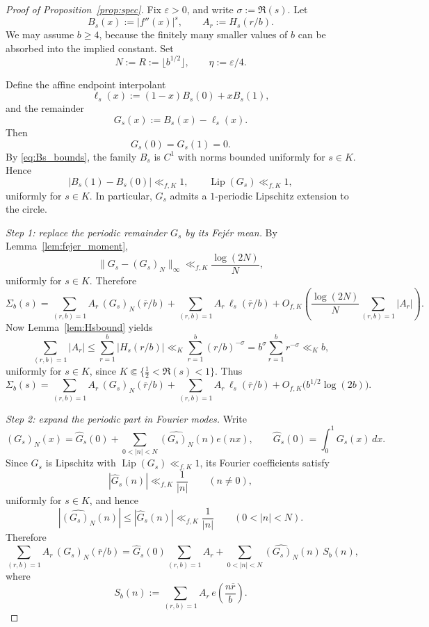 \documentclass[a4paper,american,11pt]{amsart}
\theoremstyle{plain}
\theoremstyle{definition}
\begin{document}
\begin{proof}[Proof of Proposition~\ref{prop:spec}]\label{proof:prop:spec}
Fix \(\varepsilon>0\), and write \(\sigma:=\Re(s)\). Let
\[
B_s(x):=|f''(x)|^s,
\qquad
A_r:=H_s(r/b).
\]
We may assume \(b\ge4\), because the finitely many smaller values of \(b\) can be absorbed into the implied constant. Set
\[
N:=R:=\lfloor b^{1/2}\rfloor,
\qquad
\eta:=\varepsilon/4.
\]

Define the affine endpoint interpolant
\[
\ell_s(x):=(1-x)B_s(0)+xB_s(1),
\]
and the remainder
\[
G_s(x):=B_s(x)-\ell_s(x).
\]
Then
\[
G_s(0)=G_s(1)=0.
\]
By \eqref{eq:Bs_bounds}, the family \(B_s\) is \(C^1\) with norms bounded uniformly for \(s\in K\). Hence
\[
|B_s(1)-B_s(0)|\ll_{f,K}1,
\qquad
\operatorname{Lip}(G_s)\ll_{f,K}1,
\]
uniformly for \(s\in K\). In particular, \(G_s\) admits a \(1\)-periodic Lipschitz extension to the circle.

\emph{Step 1: replace the periodic remainder \(G_s\) by its Fej\'er mean.}
By Lemma~\ref{lem:fejer_moment},
\[
\|G_s-(G_s)_N\|_\infty \ll_{f,K} \frac{\log(2N)}{N},
\]
uniformly for \(s\in K\). Therefore
\[\!
\Sigma_b(s)
=
\sum_{(r,b)=1} A_r\,(G_s)_N(\overline r/b)
+
\sum_{(r,b)=1} A_r\,\ell_s(\overline r/b)
+
O_{f,K}\!\left(\frac{\log(2N)}{N}\sum_{(r,b)=1}|A_r|\right).
\]
Now Lemma~\ref{lem:Hsbound} yields
\[
\sum_{(r,b)=1}|A_r|
\le
\sum_{r=1}^b |H_s(r/b)|
\ll_K
\sum_{r=1}^b (r/b)^{-\sigma}
=
b^\sigma\sum_{r=1}^b r^{-\sigma}
\ll_K b,
\]
uniformly for \(s\in K\), since \(K\Subset\{\tfrac12<\Re(s)<1\}\). Thus
\begin{equation}
\label{eq:step1}
\Sigma_b(s)
=
\sum_{(r,b)=1} A_r\,(G_s)_N(\overline r/b)
+
\sum_{(r,b)=1} A_r\,\ell_s(\overline r/b)
+
O_{f,K}\bigl(b^{1/2}\log(2b)\bigr).
\end{equation}

\emph{Step 2: expand the periodic part in Fourier modes.}
Write
\[
(G_s)_N(x)=\widehat G_s(0)+\sum_{0<|n|<N}\widehat{(G_s)_N}(n)e(nx),
\qquad
\widehat G_s(0)=\int_0^1 G_s(x)\,dx.
\]
Since \(G_s\) is Lipschitz with \(\operatorname{Lip}(G_s)\ll_{f,K}1\), its Fourier coefficients satisfy
\[
|\widehat G_s(n)|\ll_{f,K}\frac1{|n|}\qquad (n\neq0),
\]
uniformly for \(s\in K\), and hence
\[
|\widehat{(G_s)_N}(n)|\le |\widehat G_s(n)|\ll_{f,K}\frac1{|n|}
\qquad (0<|n|<N).
\]
Therefore
\[
\sum_{(r,b)=1} A_r\,(G_s)_N(\overline r/b)
=
\widehat G_s(0)\sum_{(r,b)=1}A_r
+
\sum_{0<|n|<N}\widehat{(G_s)_N}(n)\,S_b(n),
\]
where
\[
S_b(n):=\sum_{(r,b)=1}A_r\,e\!\left(\frac{n\overline r}{b}\right).
\]


\end{proof}
\end{document}
